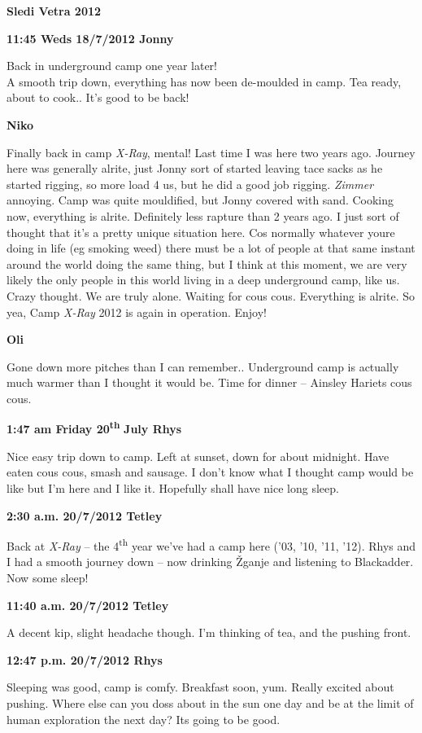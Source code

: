 \textbf{Sledi Vetra 2012}

\textbf{11:45 Weds 18/7/2012 Jonny}

Back in underground camp one year later!\\
A smooth trip down, everything has now been de-moulded in camp. Tea
ready, about to cook.. It's good to be back!

\textbf{Niko}

Finally back in camp \emph{X-Ray}, mental! Last time I was here two
years ago. Journey here was generally alrite, just Jonny sort of started
leaving tace sacks as he started rigging, so more load 4 us, but he did
a good job rigging. \emph{Zimmer} annoying. Camp was quite mouldified,
but Jonny covered with sand. Cooking now, everything is alrite.
Definitely less rapture than 2 years ago. I just sort of thought that
it's a pretty unique situation here. Cos normally whatever youre doing
in life (eg smoking weed) there must be a lot of people at that same
instant around the world doing the same thing, but I think at this
moment, we are very likely the only people in this world living in a
deep underground camp, like us. Crazy thought. We are truly alone.
Waiting for cous cous. Everything is alrite. So yea, Camp \emph{X-Ray}
2012 is again in operation. Enjoy!

\textbf{Oli}

Gone down more pitches than I can remember.. Underground camp is
actually much warmer than I thought it would be. Time for dinner --
Ainsley Hariets cous cous.

\textbf{1:47 am Friday 20\textsuperscript{th}} \textbf{July Rhys}

Nice easy trip down to camp. Left at sunset, down for about midnight.
Have eaten cous cous, smash and sausage. I don't know what I thought
camp would be like but I'm here and I like it. Hopefully shall have nice
long sleep.

\textbf{2:30 a.m. 20/7/2012 Tetley}

Back at \emph{X-Ray} -- the 4\textsuperscript{th} year we've had a camp
here ('03, '10, '11, '12). Rhys and I had a smooth journey down -- now
drinking Žganje and listening to Blackadder. Now some sleep!

\textbf{11:40 a.m. 20/7/2012 Tetley}

A decent kip, slight headache though. I'm thinking of tea, and the
pushing front.

\textbf{12:47 p.m. 20/7/2012 Rhys}

Sleeping was good, camp is comfy. Breakfast soon, yum. Really excited
about pushing. Where else can you doss about in the sun one day and be
at the limit of human exploration the next day? Its going to be good.

